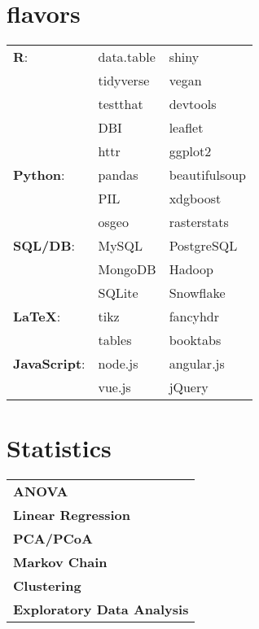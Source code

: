 \documentclass[10pt]{article}%
\begin{document}
\begin{minipage}[ht]{.25\linewidth}
   \section*{\faCubes{} flavors}%
   \flushright
   {\small
      \begin{tabularx}{\linewidth}{p{.24\linewidth}XX}
         \textbf{R}: & data.table & shiny \\
                     & tidyverse  & vegan \\
                     & testthat   & devtools \\
                     & DBI        & leaflet \\
                     & httr       & ggplot2 \\
         \textbf{Python}: & pandas & beautifulsoup \\
                          & PIL    & xdgboost \\
                          & osgeo  & rasterstats \\
         \textbf{SQL/DB}: & MySQL & PostgreSQL \\
                       & MongoDB & Hadoop \\
                       & SQLite  & Snowflake \\
         \textbf{\LaTeX }:  & tikz   & fancyhdr \\
                           & tables & booktabs \\
         \textbf{JavaScript}: & node.js & angular.js \\
                              & vue.js & jQuery
     \end{tabularx}}
     \flushleft%
   \section*{\faBarChart{} Statistics}%
   \flushright
   {\small
      \begin{tabularx}{\linewidth}{X}
        \textbf{ANOVA} \\
        \textbf{Linear Regression} \\
        \textbf{PCA/PCoA} \\
        \textbf{Markov Chain} \\
        \textbf{Clustering} \\
        \textbf{Exploratory Data Analysis}
      \end{tabularx}}
      \flushleft%
\end{minipage}%
\end{document}
